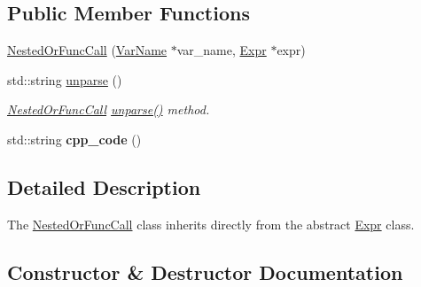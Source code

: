 \subsection*{Public Member Functions}
\begin{DoxyCompactItemize}
\item 
\hyperlink{classfcal_1_1ast_1_1NestedOrFuncCall_ae6fe55c5f7d5a51b83631e33eb818698}{Nested\+Or\+Func\+Call} (\hyperlink{classfcal_1_1ast_1_1VarName}{Var\+Name} $\ast$var\+\_\+name, \hyperlink{classfcal_1_1ast_1_1Expr}{Expr} $\ast$expr)
\item 
std\+::string \hyperlink{classfcal_1_1ast_1_1NestedOrFuncCall_a1a8bc927427f8f11f0be98abbc89e9c9}{unparse} ()
\begin{DoxyCompactList}\small\item\em \hyperlink{classfcal_1_1ast_1_1NestedOrFuncCall}{Nested\+Or\+Func\+Call} \hyperlink{classfcal_1_1ast_1_1NestedOrFuncCall_a1a8bc927427f8f11f0be98abbc89e9c9}{unparse()} method. \end{DoxyCompactList}\item 
std\+::string {\bfseries cpp\+\_\+code} ()\hypertarget{classfcal_1_1ast_1_1NestedOrFuncCall_af6af5a0e3b599e6836f63535e9ded834}{}\label{classfcal_1_1ast_1_1NestedOrFuncCall_af6af5a0e3b599e6836f63535e9ded834}

\end{DoxyCompactItemize}


\subsection{Detailed Description}
The \hyperlink{classfcal_1_1ast_1_1NestedOrFuncCall}{Nested\+Or\+Func\+Call} class inherits directly from the abstract \hyperlink{classfcal_1_1ast_1_1Expr}{Expr} class. 

\subsection{Constructor \& Destructor Documentation}
